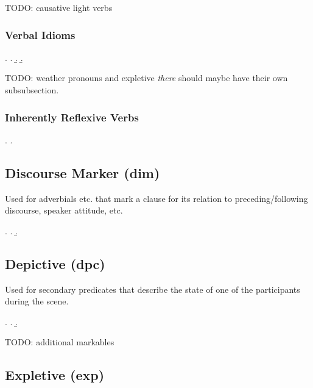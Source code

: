 \documentclass[a4paper]{article}
\begin{document}
TODO: causative light verbs

\subsubsection{Verbal Idioms}

\ex.
\a. 
\b. 
\b. 

TODO: weather pronouns and expletive \emph{there} should maybe have their own
subsubsection.

\subsubsection{Inherently Reflexive Verbs}

\ex.
\a. 


\clearpage
\subsection{Discourse Marker (\textsf{dim})}
\label{sec:dim}

Used for adverbials etc. that mark a clause for its relation to preceding/following discourse, speaker attitude, etc.

\ex.
\a. 
\b. 

\clearpage
\subsection{Depictive (\textsf{dpc})}
\label{sec:dpc}

Used for secondary predicates that describe the state of one of the participants during the scene.

\ex.
\a. 
\b. 

TODO: additional markables

\clearpage
\subsection{Expletive (\textsf{exp})}
\label{sec:exp}
\end{document}
